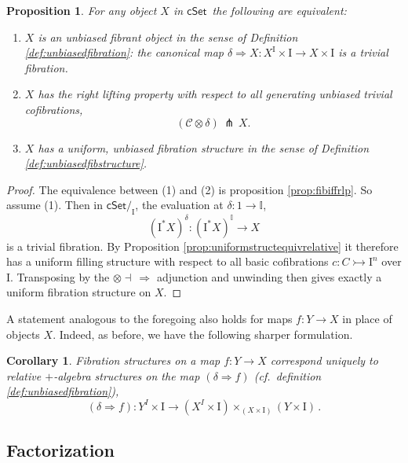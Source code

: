 \documentclass[11pt]{amsart}
\newcommand{\ie}{\emph{i.e.}}
\newcommand{\cSet}{\ensuremath{\mathsf{cSet}}}
\newcommand{\mono}{\ensuremath{\rightarrowtail}}
\newcommand{\ra}{\ensuremath{\rightarrow}}
\renewcommand{\to}{\ensuremath{\rightarrow}}
\newcommand{\too}{\ensuremath{\longrightarrow}}
\newcommand{\I}{\ensuremath{\mathrm{I}}}
\newcommand{\II}{\ensuremath{\mathbb{I}}}
\newtheorem{proposition}[theorem]{Proposition}
\newtheorem{corollary}[theorem]{Corollary}
\theoremstyle{remark}
\theoremstyle{definition}
\begin{document}
\begin{proposition}\label{prop:equivfibstruc} For any object $X$ in \cSet\ the following are equivalent:
\begin{enumerate}
\item $X$ is an unbiased fibrant object in the sense of Definition \ref{def:unbiasedfibration}: the canonical map $\delta\Rightarrow X : X^\I\times \I \ra X\times \I$ is a trivial fibration. 

\item $X$ has the right lifting property with respect to all generating unbiased trivial cofibrations,
\[
(\mathcal{C}\otimes\delta)\, \pitchfork\,X.
\]

\item $X$ has a uniform, unbiased fibration structure in the sense of Definition \ref{def:unbiasedfibstructure}.
\end{enumerate}
\end{proposition}

\begin{proof}
The equivalence between (1) and (2) is proposition \ref{prop:fibiffrlp}.  
So assume (1).
Then in $\cSet/_\I$, the evaluation at $\delta : 1\to\II$,
\[
(\I^*X)^\delta : (\I^*X)^\II \too X
\]
is a trivial fibration.  By Proposition \ref{prop:uniformstructequivrelative} it therefore 
has a uniform filling structure with respect to all basic cofibrations $c :C\mono \I^n$ over $\I$.  Transposing by the $\otimes\dashv\,\Rightarrow$ adjunction and unwinding then gives exactly a uniform fibration structure on $X$.
\end{proof}

A statement analogous to the foregoing also holds for maps $f:Y\ra X$ in place of objects $X$.  Indeed, as before, we have the following sharper formulation.

\begin{corollary}
Fibration structures on a map $f : Y\ra X$ correspond uniquely to relative $+$-algebra structures on the map $(\delta\Rightarrow{f})$ (cf.\ definition \ref{def:unbiasedfibration}),
\[
(\delta\Rightarrow{f}) : Y^I\times \I \too (X^I \times \I)\times_{(X\times \I)} (Y\times\I)\,.
\]
\end{corollary}

\subsection{Factorization}\label{subsec:FWFS}
\end{document}

